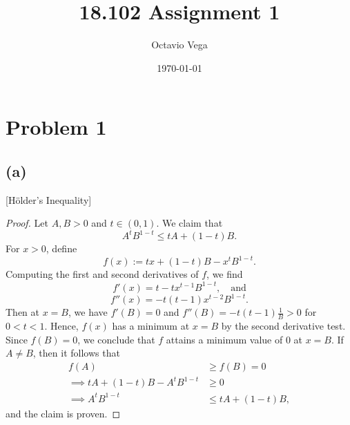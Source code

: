 \documentclass{article}
\title{18.102 Assignment 1}
\author{Octavio Vega}
\date\today
\begin{document}
\maketitle

\section*{Problem 1}
\subsection*{(a)}
[Hölder's Inequality]
\begin{proof}
	Let $A,B>0$ and $t\in(0,1)$. We claim that 
	\begin{equation}\label{hint}
		A^tB^{1-t}\leq tA + (1-t)B.
	\end{equation}
	For $x>0$, define $$f(x):= tx + (1-t)B -x^tB^{1-t}.$$
	Computing the first and second derivatives of $f$, we find $$f'(x)=t-tx^{t-1}B^{1-t},\quad \textrm{and}$$
	$$f''(x)=-t(t-1)x^{t-2}B^{1-t}.$$
	Then at $x=B$, we have $f'(B)=0$ and $f''(B)=-t(t-1)\frac{1}{B}>0$ for $0<t<1$. Hence, $f(x)$ has a minimum at $x=B$ by the second derivative test. Since $f(B)=0$, we conclude that $f$ attains a minimum value of 0 at $x=B$. If $A\neq B$, then it follows that
	\begin{align}
		f(A) &\geq f(B)=0\\
		 \implies tA + (1-t)B - A^tB^{1-t}&\geq 0\\
		 \implies A^tB^{1-t}&\leq tA + (1-t)B,
	\end{align}
	and the claim is proven. 
	

\end{proof}
\end{document}
